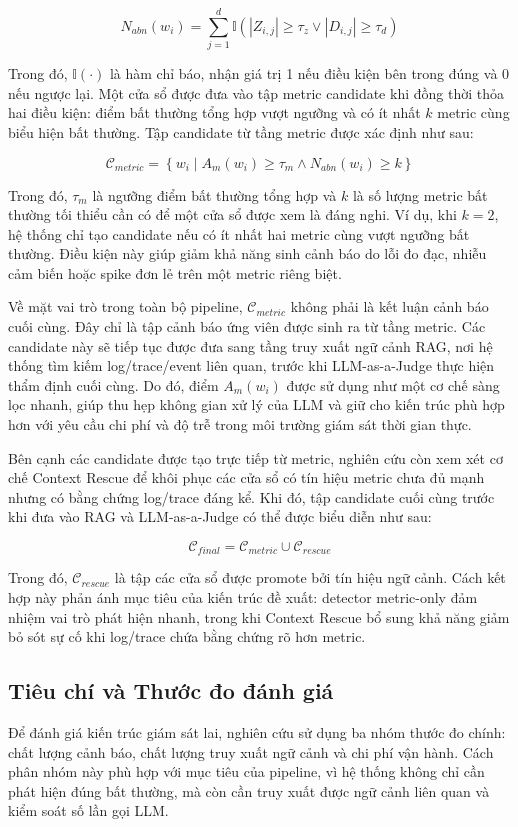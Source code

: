 \textbf{\[
N_{abn}(w_i)=
\sum_{j=1}^{d}
\mathbb{I}
\left(
|Z_{i,j}| \ge \tau_z
\lor
|D_{i,j}| \ge \tau_d
\right)
\]}

Trong đó, \(\mathbb{I}(\cdot)\) là hàm chỉ báo, nhận giá trị 1 nếu điều kiện bên trong đúng và 0 nếu ngược lại. Một cửa sổ được đưa vào tập metric candidate khi đồng thời thỏa hai điều kiện: điểm bất thường tổng hợp vượt ngưỡng và có ít nhất \(k\) metric cùng biểu hiện bất thường. Tập candidate từ tầng metric được xác định như sau:

\[
\mathcal{C}_{metric}
=
\left\{
w_i
\mid
A_m(w_i)\ge \tau_m
\land
N_{abn}(w_i)\ge k
\right\}
\]

Trong đó, \(\tau_m\) là ngưỡng điểm bất thường tổng hợp và \(k\) là số lượng metric bất thường tối thiểu cần có để một cửa sổ được xem là đáng nghi. Ví dụ, khi \(k=2\), hệ thống chỉ tạo candidate nếu có ít nhất hai metric cùng vượt ngưỡng bất thường. Điều kiện này giúp giảm khả năng sinh cảnh báo do lỗi đo đạc, nhiễu cảm biến hoặc spike đơn lẻ trên một metric riêng biệt.

Về mặt vai trò trong toàn bộ pipeline, \(\mathcal{C}_{metric}\) không phải là kết luận cảnh báo cuối cùng. Đây chỉ là tập cảnh báo ứng viên được sinh ra từ tầng metric. Các candidate này sẽ tiếp tục được đưa sang tầng truy xuất ngữ cảnh RAG, nơi hệ thống tìm kiếm log/trace/event liên quan, trước khi LLM-as-a-Judge thực hiện thẩm định cuối cùng. Do đó, điểm \(A_m(w_i)\) được sử dụng như một cơ chế sàng lọc nhanh, giúp thu hẹp không gian xử lý của LLM và giữ cho kiến trúc phù hợp hơn với yêu cầu chi phí và độ trễ trong môi trường giám sát thời gian thực.

Bên cạnh các candidate được tạo trực tiếp từ metric, nghiên cứu còn xem xét cơ chế Context Rescue để khôi phục các cửa sổ có tín hiệu metric chưa đủ mạnh nhưng có bằng chứng log/trace đáng kể. Khi đó, tập candidate cuối cùng trước khi đưa vào RAG và LLM-as-a-Judge có thể được biểu diễn như sau:

\[
\mathcal{C}_{final}
=
\mathcal{C}_{metric}
\cup
\mathcal{C}_{rescue}
\]

Trong đó, \(\mathcal{C}_{rescue}\) là tập các cửa sổ được promote bởi tín hiệu ngữ cảnh. Cách kết hợp này phản ánh mục tiêu của kiến trúc đề xuất: detector metric-only đảm nhiệm vai trò phát hiện nhanh, trong khi Context Rescue bổ sung khả năng giảm bỏ sót sự cố khi log/trace chứa bằng chứng rõ hơn metric.


\subsection{Tiêu chí và Thước đo đánh giá}
Để đánh giá kiến trúc giám sát lai, nghiên cứu sử dụng ba nhóm thước đo chính: chất lượng cảnh báo, chất lượng truy xuất ngữ cảnh và chi phí vận hành. Cách phân nhóm này phù hợp với mục tiêu của pipeline, vì hệ thống không chỉ cần phát hiện đúng bất thường, mà còn cần truy xuất được ngữ cảnh liên quan và kiểm soát số lần gọi LLM.
